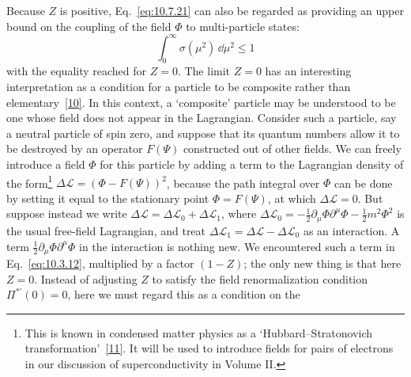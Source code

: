 Because $Z$ is positive, Eq.~\eqref{eq:10.7.21} can also be regarded as
providing an upper bound on the coupling of the field $\Phi$ to multi-particle
states:
\begin{equation}
  \int_0^\infty\sigma(\mu^2)\,\dd\mu^2\leq1
  \tag{10.7.23}\label{eq:10.7.23}
\end{equation}
with the equality reached for $Z=0$. The limit $Z=0$ has an interesting
interpretation as a condition for a particle to be composite rather than
elementary~\hyperref[ref:10.10]{[10]}. In this context, a `composite' particle
may be understood to be one whose field does not appear in the Lagrangian.
Consider such a particle, say a neutral particle of spin zero, and suppose
that its quantum numbers allow it to be destroyed by an operator $F(\Psi)$
constructed out of other fields. We can freely introduce a field $\Phi$ for
this particle by adding a term to the Lagrangian density of the
form\footnote{This is known in condensed matter physics as a
`Hubbard--Stratonovich transformation'~\hyperref[ref:10.11]{[11]}. It will be
used to introduce fields for pairs of electrons in our discussion of
superconductivity in Volume II.} $\Delta\mathcal L=(\Phi-F(\Psi))^2$,
because the path integral over $\Phi$ can be done by setting it equal to the
stationary point $\Phi=F(\Psi)$, at which $\Delta\mathcal L=0$. But suppose
instead we write $\Delta\mathcal L=\Delta\mathcal L_0+\Delta\mathcal L_1$,
where $\Delta\mathcal L_0=-\frac12\partial_\mu\Phi\partial^\mu\Phi
-\frac12m^2\Phi^2$ is the usual free-field Lagrangian, and treat
$\Delta\mathcal L_1=\Delta\mathcal L-\Delta\mathcal L_0$ as an interaction.
A term $\frac12\partial_\mu\Phi\partial^\mu\Phi$ in the interaction is nothing
new. We encountered such a term in Eq.~\eqref{eq:10.3.12}, multiplied by a
factor $(1-Z)$; the only new thing is that here $Z=0$. Instead of adjusting
$Z$ to satisfy the field renormalization condition $\Pi^{*\prime}(0)=0$, here
we must regard this as a condition on the
